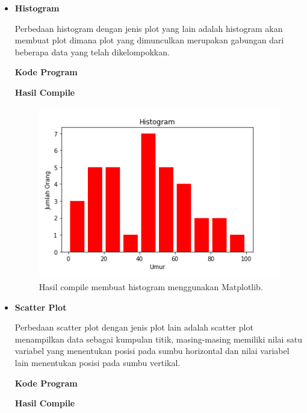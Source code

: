 \begin{enumerate}
\begin{itemize}
				\item \textbf{Histogram}
				
				Perbedaan histogram dengan jenis plot yang lain adalah histogram akan membuat plot dimana plot yang dimunculkan merupakan gabungan dari beberapa data yang telah dikelompokkan.
				
				\textbf{Kode Program}
				
				
				
				\textbf{Hasil Compile}
				
				\begin{figure}[H]
					\includegraphics[width=12cm]{figures/chapter6/1174057/3histogram.png}
					\centering
					\caption{Hasil compile membuat histogram menggunakan Matplotlib.}
				\end{figure}
				
				\item \textbf{Scatter Plot}
				
				Perbedaan scatter plot dengan jenis plot lain adalah scatter plot menampilkan data sebagai kumpulan titik, masing-masing memiliki nilai satu variabel yang menentukan posisi pada sumbu horizontal dan nilai variabel lain menentukan posisi pada sumbu vertikal.
				
				\textbf{Kode Program}
				
				
				
				\textbf{Hasil Compile}
				

\end{itemize}
\end{enumerate}
